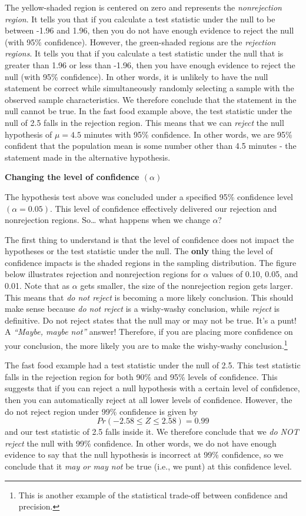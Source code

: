 \documentclass[
]{book}
\begin{document}
The yellow-shaded region is centered on zero and represents the \emph{nonrejection region}. It tells you that if you calculate a test statistic under the null to be between -1.96 and 1.96, then you do not have enough evidence to reject the null (with 95\% confidence). However, the green-shaded regions are the \emph{rejection regions}. It tells you that if you calculate a test statistic under the null that is greater than 1.96 or less than -1.96, then you have enough evidence to reject the null (with 95\% confidence). In other words, it is unlikely to have the null statement be correct while simultaneously randomly selecting a sample with the observed sample characteristics. We therefore conclude that the statement in the null cannot be true. In the fast food example above, the test statistic under the null of 2.5 falls in the rejection region. This means that we can \emph{reject} the null hypothesis of \(\mu=4.5\) minutes with 95\% confidence. In other words, we are 95\% confident that the population mean is some number other than 4.5 minutes - the statement made in the alternative hypothesis.

\textbf{Changing the level of confidence \((\alpha)\)}

The hypothesis test above was concluded under a specified 95\% confidence level \((\alpha=0.05)\). This level of confidence effectively delivered our rejection and nonrejection regions. So\ldots{} what happens when we change \(\alpha\)?

The first thing to understand is that the level of confidence does not impact the hypotheses or the test statistic under the null. The \textbf{only} thing the level of confidence impacts is the shaded regions in the sampling distribution. The figure below illustrates rejection and nonrejection regions for \(\alpha\) values of 0.10, 0.05, and 0.01. Note that as \(\alpha\) gets smaller, the size of the nonrejection region gets larger. This means that \emph{do not reject} is becoming a more likely conclusion. This should make sense because \emph{do not reject} is a wishy-washy conclusion, while \emph{reject} is definitive. Do not reject states that the null may or may not be true. It's a punt! A \emph{``Maybe, maybe not''} answer! Therefore, if you are placing more confidence on your conclusion, the more likely you are to make the wishy-washy conclusion.\footnote{This is another example of the statistical trade-off between confidence and precision.}

The fast food example had a test statistic under the null of 2.5. This test statistic falls in the rejection region for both 90\% and 95\% levels of confidence. This suggests that if you can reject a null hypothesis with a certain level of confidence, then you can automatically reject at all lower levels of confidence. However, the do not reject region under 99\% confidence is given by
\[Pr(-2.58 \leq Z \leq 2.58)=0.99\]
and our test statistic of 2.5 falls inside it. We therefore conclude that we \emph{do NOT reject} the null with 99\% confidence. In other words, we do not have enough evidence to say that the null hypothesis is incorrect at 99\% confidence, so we conclude that it \emph{may or may not} be true (i.e., we punt) at this confidence level.
\end{document}

